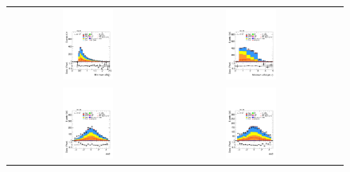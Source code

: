 \begin{figure}[htbp]
\begin{tabular}{@{}c c c@{}}
    \includegraphics[width=0.33\textwidth]{images/plots_modelling_run2_run3_variables/run_3_tth/plot_jjdrmin_hh_tth_22_23_24.pdf} &
    \includegraphics[width=0.33\textwidth]{images/plots_modelling_run2_run3_variables/run_3_tth/plot_min_dr_btau_hh_tth_22_23_24.pdf}\\[4pt]
    \includegraphics[width=0.33\textwidth]{images/plots_modelling_run2_run3_variables/run_3_tth/plot_eta2_hh_tth_22_23_24.pdf} &
    \includegraphics[width=0.33\textwidth]{images/plots_modelling_run2_run3_variables/run_3_tth/plot_eta3_hh_tth_22_23_24.pdf} &

\end{tabular}
\end{figure}
